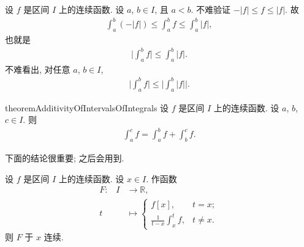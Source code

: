 \begin{example}
    设 $f$ 是区间 $I$ 上的连续函数. 设 $a$, $b \in I$, 且 $a < b$. 不难验证 $-|f| \leq f \leq |f|$. 故
    \begin{align*}
        \int_{a}^{b} {(-|f|)} \leq \int_{a}^{b} {f} \leq \int_{a}^{b} {|f|},
    \end{align*}
    也就是
    \begin{align*}
        \Bigg| \int_{a}^{b} {f} \Bigg| \leq \int_{a}^{b} {|f|}.
    \end{align*}
    不难看出, 对任意 $a$, $b \in I$,
    \begin{align*}
        \Bigg| \int_{a}^{b} {f} \Bigg| \leq \Bigg| \int_{a}^{b} {|f|} \Bigg|.
    \end{align*}
\end{example}

\begin{restatable}{theorem}{AdditivityOfIntervalsOfIntegrals}
    设 $f$ 是区间 $I$ 上的连续函数. 设 $a$, $b$, $c \in I$. 则
    \begin{align*}
        \int_{a}^{c} {f} = \int_{a}^{b} {f} + \int_{b}^{c} {f}.
    \end{align*}
\end{restatable}

下面的结论很重要; 之后会用到.

\begin{theorem} \label{theorem:newton-leibniz-prerequisite}
    设 $f$ 是区间 $I$ 上的连续函数. 设 $x \in I$. 作函数
    \begin{align*}
        \text{$F$:} \quad
        I & \to \mathbb{R},                                                       \\
        t & \mapsto \begin{cases}
                        f[x],                                             & t = x;    \\
                        {\displaystyle \frac{1}{t - x} \int_{x}^{t} {f}}, & t \neq x.
                    \end{cases}
    \end{align*}
    则 $F$ 于 $x$ 连续.
\end{theorem}

